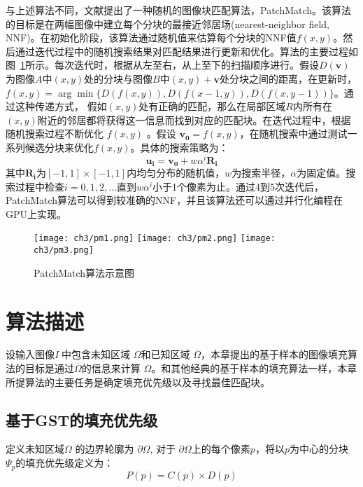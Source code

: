 与上述算法不同，文献提出了一种随机的图像块匹配算法，PatchMatch。该算法的目标是在两幅图像中建立每个分块的最接近邻居场(nearest-neighbor field, NNF)。在初始化阶段，该算法通过随机值来估算每个分块的NNF值$f(x,y)$。然后通过迭代过程中的随机搜索结果对匹配结果进行更新和优化。算法的主要过程如图~\ref{ch3:fig:patchmatch}所示。每次迭代时，根据从左至右，从上至下的扫描顺序进行。假设$D(\textbf{v})$为图像$A$中$(x,y)$处的分块与图像$B$中$(x,y)+ \textbf{v} $处分块之间的距离，在更新时，$f(x,y) = \arg \min\{D(f(x,y)),D(f(x-1,y)),D(f(x,y-1))\}$。通过这种传递方式， 假如$(x,y)$处有正确的匹配，那么在局部区域$R$内所有在$(x,y)$附近的邻居都将获得这一信息而找到对应的匹配块。在迭代过程中，根据随机搜索过程不断优化 $f(x,y)$ 。假设 $ \mathbf{{v_{0}}}= f(x,y)$，在随机搜索中通过测试一系列候选分块来优化$f(x,y)$。具体的搜索策略为：
$$ \mathbf{u_i} = \mathbf{v_0} + w\alpha^{i}\mathbf{R_{i}}$$
其中$\mathbf{R_{i}}$为$[-1,1] \times [-1,1]$内均匀分布的随机值，$w$为搜索半径，$\alpha$为固定值。搜索过程中检查$i=0,1,2,\ldots$直到$w\alpha^i$小于1个像素为止。通过4到5次迭代后，PatchMatch算法可以得到较准确的NNF，并且该算法还可以通过并行化编程在GPU上实现。

 \begin{figure}[htb]
  \centering%
    {\texttt{[image: ch3/pm1.png]}}%
 \hspace{1em}%
      {\texttt{[image: ch3/pm2.png]}}
 \hspace{1em}
      {\texttt{[image: ch3/pm3.png]}}
  \caption{PatchMatch算法示意图~\cite{Barnes:2009}}
  \label{ch3:fig:patchmatch}
\end{figure}
 \section{算法描述}
 \label{ch3:sec:algorithm}
 设输入图像\emph{I} 中包含未知区域 \(\Omega\)和已知区域 \(\overline{\Omega}\)，本章提出的基于样本的图像填充算法的目标是通过\(\overline{\Omega}\)的信息来计算 \(\Omega\)。和其他经典的基于样本的填充算法一样，本章所提算法的主要任务是确定填充优先级以及寻找最佳匹配块。
 \subsection{基于GST的填充优先级}
 \label{sec:sub:GST}

 定义未知区域\(\Omega\) 的边界轮廓为 \(\partial\Omega\), 对于 \(\partial\Omega\)上的每个像素\(p\)，将以\(p\)为中心的分块\(\Psi_p\)的填充优先级定义为：
 \begin{equation}
    \label{equ:chap3:order}
    P(p)=C(p)\times D(p)
 \end{equation}

